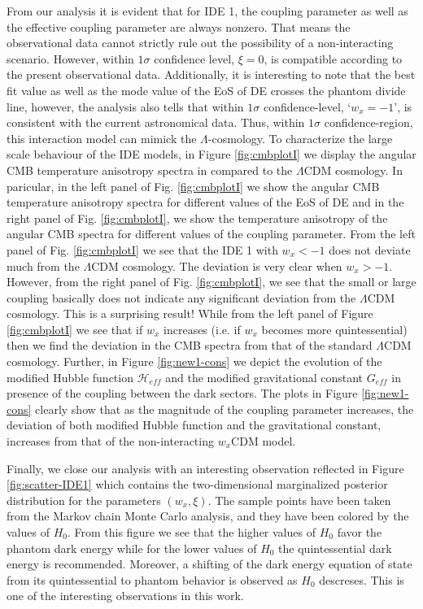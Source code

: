 \documentclass[superscriptaddress,oneolumn,secnumarabic,
amssymb,amsmath,nobibnotes,aps,prd,showpacs,nofootinbib]{revtex4}%
\begin{document}
From our analysis it is evident that for IDE 1, the coupling parameter as well as the effective coupling parameter are always nonzero. That means the observational data cannot strictly rule out the possibility of a non-interacting scenario. However, within $1\sigma$ confidence level, $\xi = 0$, is compatible according to the present observational data.
Additionally,  it is interesting to note that the best fit value as well as the mode value of the EoS of DE crosses the phantom divide line, however, the analysis also tells that within $1\sigma$ confidence-level, `$w_x = -1$', is consistent with the current astronomical data. Thus, within $1\sigma$ confidence-region, this interaction model can mimick the $\Lambda$-cosmology.  To characterize the large scale behaviour of the IDE models, in Figure \ref{fig:cmbplotI} we display the angular CMB temperature anisotropy spectra in compared to the $\Lambda$CDM cosmology.  In paricular, in the left panel of Fig. \ref{fig:cmbplotI} we show the angular CMB temperature anisotropy spectra for different values of the EoS of DE and in the right panel of Fig. \ref{fig:cmbplotI}, we show the temperature anisotropy of the angular CMB spectra for different values of the coupling parameter. From the left panel of Fig. \ref{fig:cmbplotI} we see that the IDE 1 with $w_x < -1$ does not deviate much from the $\Lambda$CDM cosmology. The deviation is very clear when $w_x > -1$. However, from the right panel of Fig. \ref{fig:cmbplotI}, we see that the small or large coupling basically does not indicate any significant deviation from the $\Lambda$CDM cosmology. This is a surprising result! While from the left panel of Figure \ref{fig:cmbplotI} we see that if $w_x$ increases (i.e. if $w_x$ becomes more quintessential) then we find the deviation in the CMB spectra from that of the standard $\Lambda$CDM cosmology.
Further, in Figure \ref{fig:new1-cons} we depict the evolution of the modified Hubble function $\mathcal{H}_{eff}$ and the modified gravitational constant $G_{eff}$ in presence of the coupling between the dark sectors. The plots in Figure \ref{fig:new1-cons} clearly  show that as the magnitude of the coupling parameter increases, the deviation of both modified Hubble function and the gravitational constant, increases from that of the non-interacting $w_x$CDM model.


Finally, we close our analysis with an interesting observation reflected in Figure \ref{fig:scatter-IDE1} which contains the two-dimensional marginalized posterior distribution for the parameters $(w_x, \xi)$. The sample points have been taken from the Markov chain Monte Carlo analysis, and they have been colored by the values of
$H_0$. From this figure we see that the higher values of $H_0$ favor the phantom dark energy while for the lower values of $H_0$ the quintessential dark energy is recommended. Moreover, a shifting of the dark energy equation of state from its quintessential to phantom behavior is observed as $H_0$ descreses. This is one of the interesting observations in this work.
\end{document}
